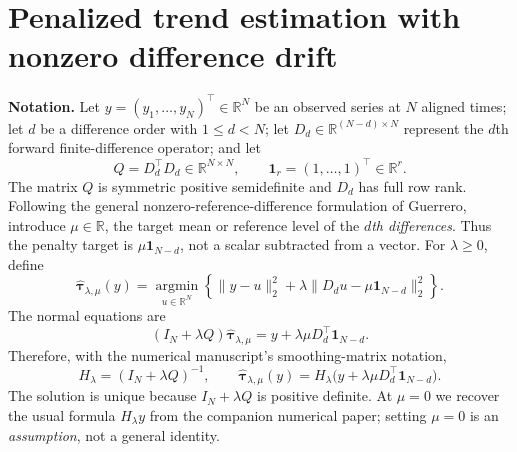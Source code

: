 \documentclass[10pt,letterpaper]{article}
\newcommand{\R}{\mathbb{R}}
\begin{document}
\section{Penalized trend estimation with nonzero difference drift}
\label{sec:pls}
\textbf{Notation.} Let $y=(y_1,\ldots,y_N)^\top\in\R^N$ be an observed
series at $N$ aligned times; let $d$ be a difference order with
$1\le d<N$; let $D_d\in\R^{(N-d)\times N}$ represent the $d$th
forward finite-difference operator; and let
\begin{equation}\label{eq:roughness}
 Q=D_d^\top D_d\in\R^{N\times N},\qquad
 \bm{1}_r=(1,\ldots,1)^\top\in\R^r.
\end{equation}
The matrix $Q$ is symmetric positive semidefinite and $D_d$ has full
row rank. Following the general nonzero-reference-difference formulation
of Guerrero, introduce $\mu\in\R$, the target mean or reference level of
the \emph{$d$th differences}. Thus the penalty target is
$\mu\bm{1}_{N-d}$, not a scalar subtracted from a vector. For
$\lambda\ge0$, define
\begin{equation}\label{eq:pls}
\widehat{\bm\tau}_{\lambda,\mu}(y)
=\underset{u\in\R^N}{\operatorname{argmin}}
\left\{\|y-u\|_2^2+
\lambda\|D_du-\mu\bm{1}_{N-d}\|_2^2\right\}.
\end{equation}
The normal equations are
\begin{equation}\label{eq:normal}
 (I_N+\lambda Q)\widehat{\bm\tau}_{\lambda,\mu}
 =y+\lambda\mu D_d^\top\bm{1}_{N-d}.
\end{equation}
Therefore, with the numerical manuscript's smoothing-matrix notation,
\begin{equation}\label{eq:H}
 H_\lambda=(I_N+\lambda Q)^{-1},\qquad
 \widehat{\bm\tau}_{\lambda,\mu}(y)
 =H_\lambda\bigl(y+\lambda\mu D_d^\top\bm{1}_{N-d}\bigr).
\end{equation}
The solution is unique because $I_N+\lambda Q$ is positive definite.
At $\mu=0$ we recover the usual formula $H_\lambda y$ from the
companion numerical paper; setting $\mu=0$ is an \emph{assumption},
not a general identity.
\end{document}
